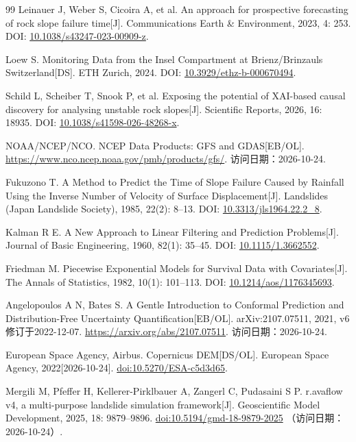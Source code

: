 \begin{thebibliography}{99}
 Leinauer J, Weber S, Cicoira A, et al. An approach for prospective forecasting of rock slope failure time[J]. Communications Earth \& Environment, 2023, 4: 253. DOI: \href{https://doi.org/10.1038/s43247-023-00909-z}{10.1038/s43247-023-00909-z}.

 Loew S. Monitoring Data from the Insel Compartment at Brienz/Brinzauls Switzerland[DS]. ETH Zurich, 2024. DOI: \href{https://doi.org/10.3929/ethz-b-000670494}{10.3929/ethz-b-000670494}.

 Schild L, Scheiber T, Snook P, et al. Exposing the potential of XAI-based causal discovery for analysing unstable rock slopes[J]. Scientific Reports, 2026, 16: 18935. DOI: \href{https://doi.org/10.1038/s41598-026-48268-x}{10.1038/s41598-026-48268-x}.

 NOAA/NCEP/NCO. NCEP Data Products: GFS and GDAS[EB/OL]. \url{https://www.nco.ncep.noaa.gov/pmb/products/gfs/}. 访问日期：2026-10-24.

 Fukuzono T. A Method to Predict the Time of Slope Failure Caused by Rainfall Using the Inverse Number of Velocity of Surface Displacement[J]. Landslides (Japan Landslide Society), 1985, 22(2): 8--13. DOI: \href{https://doi.org/10.3313/jls1964.22.2_8}{10.3313/jls1964.22.2\_8}.

 Kalman R E. A New Approach to Linear Filtering and Prediction Problems[J]. Journal of Basic Engineering, 1960, 82(1): 35--45. DOI: \href{https://doi.org/10.1115/1.3662552}{10.1115/1.3662552}.

 Friedman M. Piecewise Exponential Models for Survival Data with Covariates[J]. The Annals of Statistics, 1982, 10(1): 101--113. DOI: \href{https://doi.org/10.1214/aos/1176345693}{10.1214/aos/1176345693}.

 Angelopoulos A N, Bates S. A Gentle Introduction to Conformal Prediction and Distribution-Free Uncertainty Quantification[EB/OL]. arXiv:2107.07511, 2021, v6修订于2022-12-07. \url{https://arxiv.org/abs/2107.07511}. 访问日期：2026-10-24.

European Space Agency, Airbus.
Copernicus DEM[DS/OL].
European Space Agency, 2022[2026-10-24].
\href{https://doi.org/10.5270/ESA-c5d3d65}{doi:10.5270/ESA-c5d3d65}.

Mergili M, Pfeffer H, Kellerer-Pirklbauer A, Zangerl C, Pudasaini S P.
r.avaflow v4, a multi-purpose landslide simulation framework[J].
Geoscientific Model Development, 2025, 18: 9879--9896.
\href{https://doi.org/10.5194/gmd-18-9879-2025}{doi:10.5194/gmd-18-9879-2025}
（访问日期：2026-10-24）.


\end{thebibliography}
